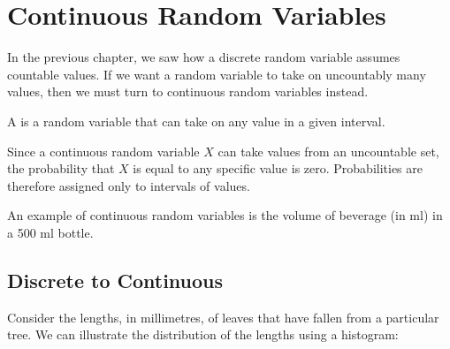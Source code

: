 \chapter{Continuous Random Variables}\label{chap:Continuous-Random-Variables}

In the previous chapter, we saw how a discrete random variable assumes countable values. If we want a random variable to take on uncountably many values, then we must turn to continuous random variables instead.

\begin{definition}\label{def:CRV}
    A  is a random variable that can take on any value in a given interval.
\end{definition}

Since a continuous random variable $X$ can take values from an uncountable set, the probability that $X$ is equal to any specific value is zero. Probabilities are therefore assigned only to intervals of values.

An example of continuous random variables is the volume of beverage (in ml) in a 500 ml bottle.

\section{Discrete to Continuous}

Consider the lengths, in millimetres, of leaves that have fallen from a particular tree. We can illustrate the distribution of the lengths using a histogram:

\begin{figure}[H]
    \centering
    \caption{}
\end{figure}

